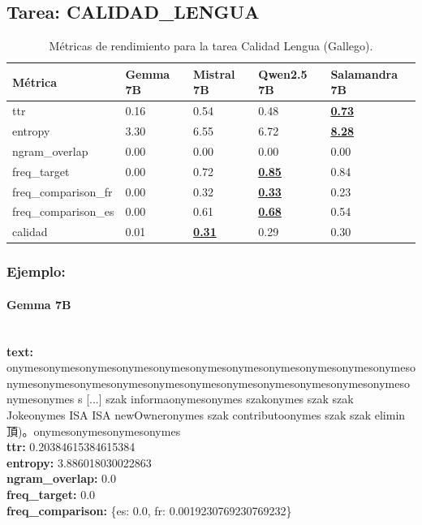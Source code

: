 \subsection{Tarea: CALIDAD\_LENGUA}\label{tarea-calidad_lengua}
\begin{longtable}[]{@{}lllll@{}}
\toprule\noalign{}
Métrica & Gemma 7B & Mistral 7B & Qwen2.5 7B & Salamandra 7B \\
\midrule\noalign{}
\endhead
\bottomrule\noalign{}
\caption{Métricas de rendimiento para la tarea Calidad Lengua (Gallego).}
\label{tab:metricas_calidad_lengua_Gallego}
\endlastfoot
ttr & 0.16 & 0.54 & 0.48 & \textbf{\underline{0.73}} \\
entropy & 3.30 & 6.55 & 6.72 & \textbf{\underline{8.28}} \\
ngram\_overlap & 0.00 & 0.00 & 0.00 & 0.00 \\
freq\_target & 0.00 & 0.72 & \textbf{\underline{0.85}} & 0.84 \\
freq\_comparison\_fr & 0.00 & 0.32 & \textbf{\underline{0.33}} & 0.23 \\
freq\_comparison\_es & 0.00 & 0.61 & \textbf{\underline{0.68}} & 0.54 \\
calidad & 0.01 & \textbf{\underline{0.31}} & 0.29 & 0.30 \\
\end{longtable}

\subsubsection{Ejemplo:}

\paragraph{Gemma 7B}~\\
\textbf{text:} onymesonymesonymesonymesonymesonymesonymesonymesonymesonymesonymesonymesonymesonymesonymesonymesonymesonymesonymesonymesonymesonymesonymesonymes s [...] szak informaonymesonymes szakonymes szak szak Jokeonymes ISA ISA newOwneronymes szak contributoonymes szak szak elimin 頂)。onymesonymesonymesonymes\\
\textbf{ttr:} 0.20384615384615384\\
\textbf{entropy:} 3.886018030022863\\
\textbf{ngram\_overlap:} 0.0\\
\textbf{freq\_target:} 0.0\\
\textbf{freq\_comparison:} \{\textquotesingle{}es\textquotesingle{}: 0.0, \textquotesingle{}fr\textquotesingle{}: 0.0019230769230769232\}

